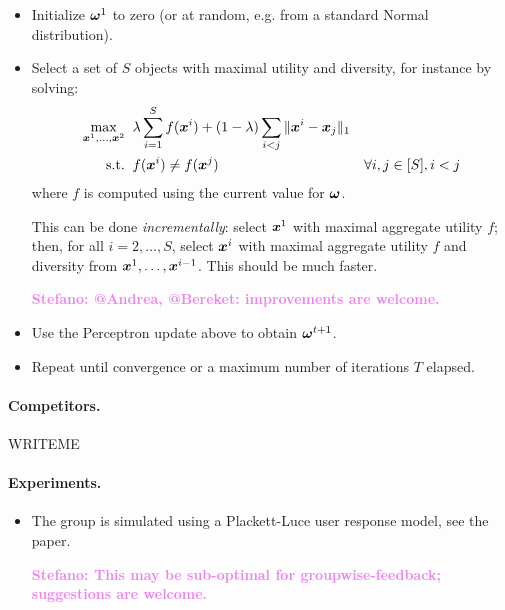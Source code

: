 \documentclass[12pt,a4paper]{article}
\newcommand{\stefano}[1]{{\bf \textcolor{violet}{{Stefano: #1}}}}
\begin{document}
\begin{itemize}
\begin{itemize}
            \item Initialize $\boldsymbol{\omega}^1$ to zero (or at random, e.g. from a
                standard Normal distribution).

            \item Select a set of $S$ objects with maximal utility and
                diversity, for instance by solving:
                \begin{align*}
                    \max_{\boldsymbol{x}^1, \ldots, \boldsymbol{x}^2}
                        & \;\; \lambda \sum_{i=1}^S f(\boldsymbol{x}^i) + (1 - \lambda) \sum_{i < j} \|\boldsymbol{x}^i - \boldsymbol{x}_j\|_1 \\
                    \text{s.t.}
                        & \;\; f(\boldsymbol{x}^i) \ne f(\boldsymbol{x}^j)
                            & \forall i,j \in [S], i < j
                \end{align*}
                where $f$ is computed using the current value for $\boldsymbol{\omega}$.

                This can be done \emph{incrementally}: select $\boldsymbol{x}^1$ with
                maximal aggregate utility $f$; then, for all $i = 2, \ldots,
                S$, select $\boldsymbol{x}^i$ with maximal aggregate utility $f$ and
                diversity from $\boldsymbol{x}^1, \ldots, \boldsymbol{x}^{i-1}$. This should be
                much faster.

                \stefano{@Andrea, @Bereket: improvements are welcome.}

            \item Use the Perceptron update above to obtain $\boldsymbol{\omega}^{t+1}$.

            \item Repeat until convergence or a maximum number of iterations
                $T$ elapsed.

        \end{itemize}

\end{itemize}

\paragraph{Competitors.}

WRITEME

\paragraph{Experiments.}

\begin{itemize}

    \item The group is simulated using a Plackett-Luce user response model,
        see the paper.

        \stefano{This may be sub-optimal for groupwise-feedback; suggestions
        are welcome.}

\end{itemize}
\end{document}
